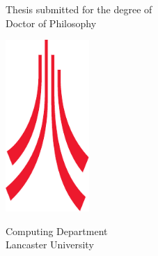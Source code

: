 \newpage
\thispagestyle{empty}
\setcounter{page}{0} %


\vspace*{0.5cm}

\begin{center}
    {\Huge\bfseries \thetitle \\}
    \vspace{1.5cm}
    {\huge \theauthor \\}

    \vspace{1.5cm}

    {\LARGE Thesis submitted for the degree of\\Doctor of Philosophy\\}

    \vspace{1.5cm}

    \includegraphics[height=6.5cm]{./lancs-logo}

    {\LARGE
    Computing Department\\
    Lancaster University\\
    \vspace{1cm}
    \thedate
}
\end{center}

